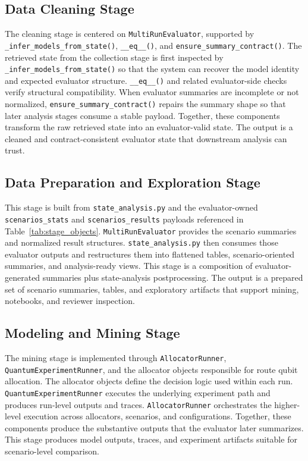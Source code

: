 \documentclass{IEEEtran}
\begin{document}
\subsection{Data Cleaning Stage}
The cleaning stage is centered on \texttt{MultiRunEvaluator}, supported by \texttt{\_infer\_models\_from\_state()}, \texttt{\_\_eq\_\_()}, and \texttt{ensure\_summary\_contract()}.
The retrieved state from the collection stage is first inspected by \texttt{\_infer\_models\_from\_state()} so that the system can recover the model identity and expected evaluator structure. \texttt{\_\_eq\_\_()} and related evaluator-side checks verify structural compatibility.
When evaluator summaries are incomplete or not normalized, \texttt{ensure\_summary\_contract()} repairs the summary shape so that later
analysis stages consume a stable payload. Together, these components transform the raw retrieved state into an evaluator-valid state. The output is a cleaned and contract-consistent evaluator state that downstream analysis can trust.

\subsection{Data Preparation and Exploration Stage}
This stage is built from \texttt{state\_analysis.py} and the evaluator-owned \texttt{scenarios\_stats} and \texttt{scenarios\_results} payloads referenced in Table~\ref{tab:stage_objects}.
\texttt{MultiRunEvaluator} provides the scenario summaries and normalized result structures. \texttt{state\_analysis.py} then consumes
those evaluator outputs and restructures them into flattened tables, scenario-oriented summaries, and analysis-ready views. This stage is a composition of evaluator-generated summaries plus state-analysis postprocessing. The output is a prepared set of scenario summaries, tables, and exploratory artifacts that support mining, notebooks, and reviewer inspection.

\subsection{Modeling and Mining Stage}
The mining stage is implemented through \texttt{AllocatorRunner}, \texttt{QuantumExperimentRunner}, and the allocator objects responsible for route qubit allocation. The allocator objects define the decision logic used within each run. \texttt{QuantumExperimentRunner} executes the underlying experiment path and produces run-level outputs and traces. \texttt{AllocatorRunner} orchestrates the higher-level execution across allocators, scenarios, and configurations. Together, these components produce the substantive outputs that the evaluator later summarizes. This stage produces model outputs, traces, and experiment artifacts suitable for scenario-level comparison.
\end{document}

